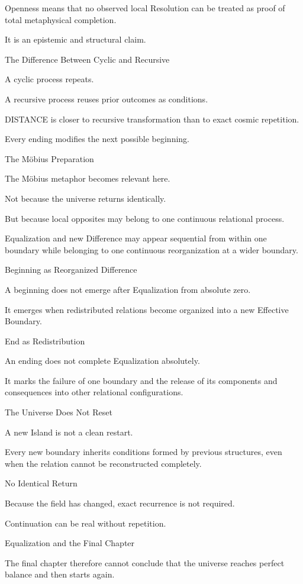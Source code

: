 Openness means that no observed local Resolution can be treated as proof of total metaphysical completion.

It is an epistemic and structural claim.

The Difference Between Cyclic and Recursive

A cyclic process repeats.

A recursive process reuses prior outcomes as conditions.

DISTANCE is closer to recursive transformation than to exact cosmic repetition.

Every ending modifies the next possible beginning.

The Möbius Preparation

The Möbius metaphor becomes relevant here.

Not because the universe returns identically.

But because local opposites may belong to one continuous relational process.

Equalization and new Difference may appear sequential from within one boundary while belonging to one continuous reorganization at a wider boundary.

Beginning as Reorganized Difference

A beginning does not emerge after Equalization from absolute zero.

It emerges when redistributed relations become organized into a new Effective Boundary.

End as Redistribution

An ending does not complete Equalization absolutely.

It marks the failure of one boundary and the release of its components and consequences into other relational configurations.

The Universe Does Not Reset

A new Island is not a clean restart.

Every new boundary inherits conditions formed by previous structures, even when the relation cannot be reconstructed completely.

No Identical Return

Because the field has changed, exact recurrence is not required.

Continuation can be real without repetition.

Equalization and the Final Chapter

The final chapter therefore cannot conclude that the universe reaches perfect balance and then starts again.

